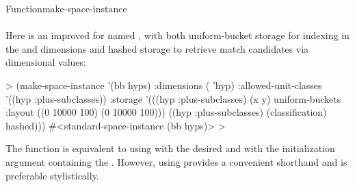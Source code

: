 \documentclass[10pt,twoside,english,pdftex]{article}
\begin{document}
\begin{functiondoc}{Function}{make-space-instance}{
      \\ 
      \\
    \returns{} }
Here is an improved  for 
 named , with both uniform-bucket storage for
indexing in the  and  dimensions and hashed storage to
retrieve match candidates via  dimensional values:
%
\W\supp
\begin{example}
  > (make-space-instance '(bb hyps)
       :dimensions ( 'hyp)
       :allowed-unit-classes '((hyp :plus-subclasses))
       :storage '(((hyp :plus-subclasses) (x y) 
                   uniform-buckets :layout ((0 10000 100)
                                            (0 10000 100)))
                  ((hyp :plus-subclasses) (classification) 
                   hashed)))
  #<standard-space-instance (bb hyps)>
  >
\end{example}

\fnnote The  function is equivalent to
using  with the desired
 and with the initialization argument
 containing the .
However, using  provides a convenient
shorthand and is preferable stylistically.

\end{functiondoc}

\end{document}
